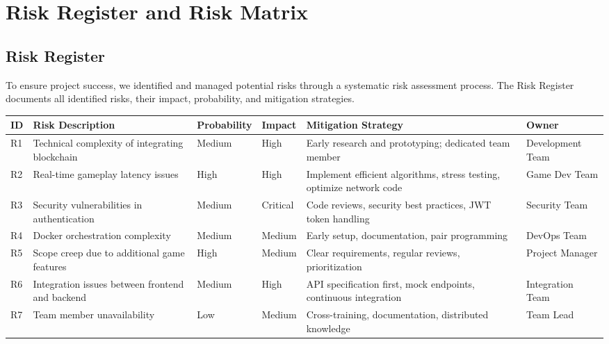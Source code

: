 \section{Risk Register and Risk Matrix}

\subsection{Risk Register}
To ensure project success, we identified and managed potential risks through a systematic risk assessment process. The Risk Register documents all identified risks, their impact, probability, and mitigation strategies.

\begin{table}[H]
\centering
\begin{tabular}{|p{0.5cm}|p{3cm}|p{2.5cm}|p{2.5cm}|p{3cm}|p{2cm}|}
\hline
\rowcolor{gray!30}
\textbf{ID} & \textbf{Risk Description} & \textbf{Probability} & \textbf{Impact} & \textbf{Mitigation Strategy} & \textbf{Owner} \\ \hline

R1 & Technical complexity of integrating blockchain & Medium & High & Early research and prototyping; dedicated team member & Development Team \\ \hline

R2 & Real-time gameplay latency issues & High & High & Implement efficient algorithms, stress testing, optimize network code & Game Dev Team \\ \hline

R3 & Security vulnerabilities in authentication & Medium & Critical & Code reviews, security best practices, JWT token handling & Security Team \\ \hline

R4 & Docker orchestration complexity & Medium & Medium & Early setup, documentation, pair programming & DevOps Team \\ \hline

R5 & Scope creep due to additional game features & High & Medium & Clear requirements, regular reviews, prioritization & Project Manager \\ \hline

R6 & Integration issues between frontend and backend & Medium & High & API specification first, mock endpoints, continuous integration & Integration Team \\ \hline

R7 & Team member unavailability & Low & Medium & Cross-training, documentation, distributed knowledge & Team Lead \\ \hline


\end{tabular}
\end{table}
